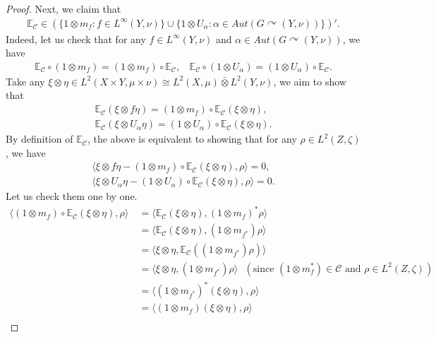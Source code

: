 \documentclass[12pt]{amsart}
\theoremstyle{definition}
\begin{document}
\begin{proof}
Next, we claim that 
\begin{align}\label{claim: claim 1 in ergodicity and invariant lemma}
\mathbb{E}_{\mathcal{C}}\in (\{1\otimes m_f: f\in L^{\infty}(Y,\nu)\}\cup \{1\otimes U_{\alpha}: \alpha\in Aut(G\curvearrowright (Y,\nu))\})'.
\end{align}
Indeed, let us check that for any $f\in L^{\infty}(Y,\nu)$ and $\alpha\in Aut(G\curvearrowright (Y,\nu))$, we have 
\begin{align*}
\mathbb{E}_{\mathcal{C}}\circ (1\otimes m_f)=(1\otimes m_f)\circ \mathbb{E}_{\mathcal{C}},~~~~
\mathbb{E}_{\mathcal{C}}\circ (1\otimes U_{\alpha})=(1\otimes U_{\alpha})\circ \mathbb{E}_{\mathcal{C}}.
\end{align*}
Take any $\xi\otimes \eta\in L^2(X\times Y,\mu\times \nu)\cong L^2(X,\mu)\bar{\otimes}L^2(Y,\nu)$, we aim to show that
\begin{align*}
\mathbb{E}_{\mathcal{C}}(\xi\otimes f\eta)=(1\otimes m_f)\circ \mathbb{E}_{\mathcal{C}}(\xi\otimes \eta),\\
\mathbb{E}_{\mathcal{C}}(\xi\otimes U_{\alpha}\eta)=(1\otimes U_{\alpha})\circ \mathbb{E}_{\mathcal{C}}(\xi\otimes \eta).
\end{align*} 
By definition of $\mathbb{E}_{\mathcal{C}}$, the above is equivalent to showing that for any $\rho\in L^2(Z,\zeta)$, we have
\begin{align*}
\langle \xi\otimes f\eta-(1\otimes m_f)\circ \mathbb{E}_{\mathcal{C}}(\xi\otimes \eta), \rho \rangle=0,\\
\langle \xi\otimes U_{\alpha}\eta-(1\otimes U_{\alpha})\circ \mathbb{E}_{\mathcal{C}}(\xi\otimes \eta), \rho \rangle=0.
\end{align*}
Let us check them one by one.
\begin{align*}
\langle (1\otimes m_f)\circ \mathbb{E}_{\mathcal{C}}(\xi\otimes \eta), \rho\rangle\
&=\langle \mathbb{E}_{\mathcal{C}}(\xi\otimes \eta), (1\otimes m_f)^*\rho\rangle\\
&=\langle \mathbb{E}_{\mathcal{C}}(\xi\otimes \eta), (1\otimes m_{f^*})\rho\rangle\\
&=\langle \xi\otimes \eta, \mathbb{E}_{\mathcal{C}}((1\otimes m_{f^*})\rho)\rangle\\
&=\langle \xi\otimes\eta, (1\otimes m_{f^*})\rho\rangle~~~(\text{since $(1\otimes m_f^*)\in \mathcal{C}$ and $\rho\in L^2(Z,\zeta)$})\\
&=\langle (1\otimes m_{f^*})^*(\xi\otimes \eta), \rho\rangle\\
&=\langle (1\otimes m_f)(\xi\otimes \eta),\rho\rangle\\

\end{align*}
\end{proof}
\end{document}
